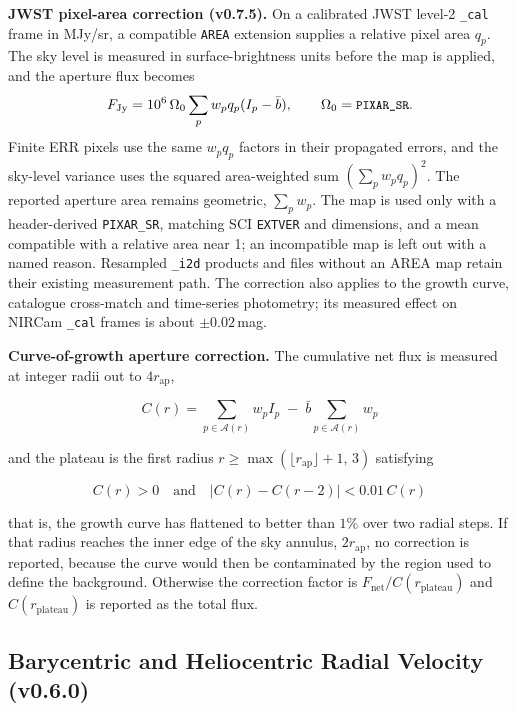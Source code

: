 \documentclass[11pt,a4paper]{article}
\newcommand{\code}[1]{\texttt{\small #1}}
\begin{document}
    \textbf{JWST pixel-area correction (v0.7.5).} On a calibrated JWST level-2 \code{\_cal} frame in MJy/sr, a compatible \code{AREA} extension supplies a relative pixel area $q_p$. The sky level is measured in surface-brightness units before the map is applied, and the aperture flux becomes
    \begin{equation}
        F_{\mathrm{Jy}} = 10^6\,\Omega_0\sum_p w_p q_p (I_p-\bar{b}),
        \qquad \Omega_0 = \code{PIXAR\_SR}.
    \end{equation}
    Finite ERR pixels use the same $w_p q_p$ factors in their propagated errors, and the sky-level variance uses the squared area-weighted sum $(\sum_p w_p q_p)^2$. The reported aperture area remains geometric, $\sum_p w_p$. The map is used only with a header-derived \code{PIXAR\_SR}, matching SCI \code{EXTVER} and dimensions, and a mean compatible with a relative area near 1; an incompatible map is left out with a named reason. Resampled \code{\_i2d} products and files without an AREA map retain their existing measurement path. The correction also applies to the growth curve, catalogue cross-match and time-series photometry; its measured effect on NIRCam \code{\_cal} frames is about $\pm0.02$\,mag.

    \textbf{Curve-of-growth aperture correction.} The cumulative net flux is measured at integer radii out to $4 r_{\text{ap}}$,

    \begin{equation}
        C(r) = \sum_{p \in \mathcal{A}(r)} w_p I_p \;-\; \bar{b} \sum_{p \in \mathcal{A}(r)} w_p
    \end{equation}

    and the plateau is the first radius $r \ge \max\!\left(\lfloor r_{\text{ap}} \rfloor + 1,\, 3\right)$ satisfying

    \begin{equation}
        C(r) > 0 \quad\text{and}\quad \left| C(r) - C(r-2) \right| < 0.01 \, C(r)
    \end{equation}

    that is, the growth curve has flattened to better than $1\%$ over two radial steps. If that radius reaches the inner edge of the sky annulus, $2 r_{\text{ap}}$, no correction is reported, because the curve would then be contaminated by the region used to define the background. Otherwise the correction factor is $F_{\text{net}} / C(r_{\text{plateau}})$ and $C(r_{\text{plateau}})$ is reported as the total flux.

    \subsection{Barycentric and Heliocentric Radial Velocity (v0.6.0)}
    \label{sec:radial_velocity}
\end{document}
